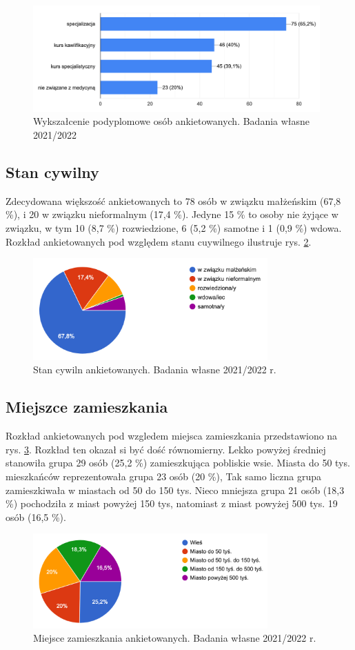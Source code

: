 \documentclass[a4paper,12pt,twoside,openany]{report}
\begin{document}
\begin{figure}
\includegraphics[width=11cm]{char_gr_bad/podyplom00}
\caption{Wykszałcenie podyplomowe osób ankietowanych. Badania własne 2021/2022}
\label{rys:podyplom}
\end{figure}


\subsection{Stan cywilny}
Zdecydowana większość ankietowanych to 78 osób w związku małżeńskim (67,8 \%), i 20 w związku nieformalnym (17,4 \%). Jedyne 15 \% to osoby nie żyjące w związku, w tym 10 (8,7 \%) rozwiedzione, 6 (5,2 \%) samotne i 1 (0,9 \%) wdowa. Rozkład ankietowanych pod względem stanu cuywilnego ilustruje rys. \ref{rys:cywil}.

\begin{figure}
\includegraphics[width=9cm]{char_gr_bad/cyw00}
\caption{Stan cywiln ankietowanych. Badania własne 2021/2022 r.}
\label{rys:cywil}
\end{figure}

\subsection{Miejszce zamieszkania}
Rozkład ankietowanych pod wzgledem miejsca zamieszkania przedstawiono na rys. \ref{rys:zamiesz}. Rozkład ten okazał si być dość równomierny. Lekko powyżej średniej stanowiła grupa 29 osób (25,2 \%) zamieszkująca pobliskie wsie. Miasta do 50 tys. mieszkańców reprezentowała grupa 23 osób (20 \%), Tak samo liczna grupa zamieszkiwała w miastach od 50 do 150 tys. Nieco mniejsza grupa 21 osób (18,3 \%) pochodziła z miast powyżej 150 tys, natomiast z miast powyżej 500 tys. 19 osób (16,5 \%).
\begin{figure}
\includegraphics[width=9cm]{char_gr_bad/zamieszka00}
\caption{Miejsce zamieszkania ankietowanych. Badania własne 2021/2022 r.}
\label{rys:zamiesz}
\end{figure}
\end{document}
